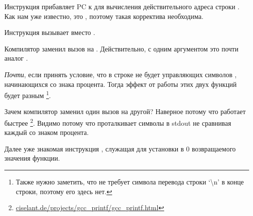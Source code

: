 Инструкция  прибавляет \ac{PC} к  для вычисления действительного адреса строки . Как нам уже известно, это \q{\PICcode}, поэтому такая корректива необходима.

Инструкция  вызывает \puts вместо \printf.

\label{puts}
Компилятор заменил вызов \printf на \puts. 
Действительно, \printf с одним аргументом это почти аналог \puts.
 
\emph{Почти}, если принять условие, что в строке не будет управляющих символов \printf, 
начинающихся со знака процента. Тогда эффект от работы этих двух функций будет разным
\footnote{Также нужно заметить, что \puts не требует символа перевода строки `\textbackslash{}n' в конце строки,
поэтому его здесь нет.}.

Зачем компилятор заменил один вызов на другой? Наверное потому что \puts работает быстрее
\footnote{\href{http://go.yurichev.com/17063}{ciselant.de/projects/gcc\_printf/gcc\_printf.html}}. 
Видимо потому что \puts проталкивает символы в \gls{stdout} не сравнивая каждый со знаком процента.

Далее уже знакомая инструкция , служащая для установки в 0 возвращаемого значения функции.

